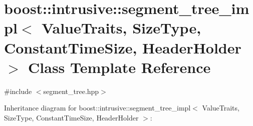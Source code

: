 \hypertarget{classboost_1_1intrusive_1_1segment__tree__impl}{}\section{boost\+:\+:intrusive\+:\+:segment\+\_\+tree\+\_\+impl$<$ Value\+Traits, Size\+Type, Constant\+Time\+Size, Header\+Holder $>$ Class Template Reference}
\label{classboost_1_1intrusive_1_1segment__tree__impl}


{\ttfamily \#include $<$segment\+\_\+tree.\+hpp$>$}



Inheritance diagram for boost\+:\+:intrusive\+:\+:segment\+\_\+tree\+\_\+impl$<$ Value\+Traits, Size\+Type, Constant\+Time\+Size, Header\+Holder $>$\+:
